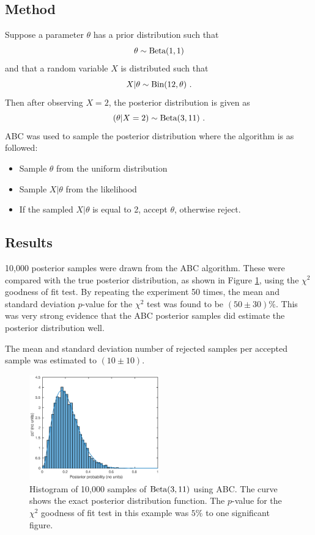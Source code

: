 \documentclass[a4paper,10pt]{article}
\begin{document}
\subsection{Method}
Suppose a parameter $\theta$ has a prior distribution such that
\begin{equation}
\theta\sim\textup{Beta}(1,1)
\end{equation}
and that a random variable $X$ is distributed such that
\begin{equation}
X|\theta\sim\textup{Bin}(12,\theta) \ .
\end{equation}
Then after observing $X=2$, the posterior distribution is given as
\begin{equation}
(\theta|X=2)\sim\textup{Beta}(3,11) \ .
\end{equation}
ABC was used to sample the posterior distribution where the algorithm is as followed:
\begin{itemize}
  \item Sample $\theta$ from the uniform distribution
  \item Sample $X|\theta$ from the likelihood
  \item If the sampled $X|\theta$ is equal to 2, accept $\theta$, otherwise reject.
\end{itemize}

\subsection{Results}
10,000 posterior samples were drawn from the ABC algorithm. These were compared with the true posterior distribution, as shown in Figure \ref{binomial}, using the $\chi^2$ goodness of fit test.  By repeating the experiment 50 times, the mean and standard deviation $p$-value for the $\chi^2$ test was found to be $(50\pm30)\%$. This was very strong evidence that the ABC posterior samples did estimate the posterior distribution well.

The mean and standard deviation number of rejected samples per accepted sample was estimated to $(10\pm10)$.

\begin{figure}
\centering
\includegraphics[width=0.5\textwidth]{binomial_ABC0528.eps}
\caption{Histogram of 10,000 samples of $\textup{Beta}(3,11)$ using ABC. The curve shows the exact posterior distribution function. The $p$-value for the $\chi^2$ goodness of fit test in this example was $5\%$ to one significant figure.}
\label{binomial}
\end{figure}
\end{document}
